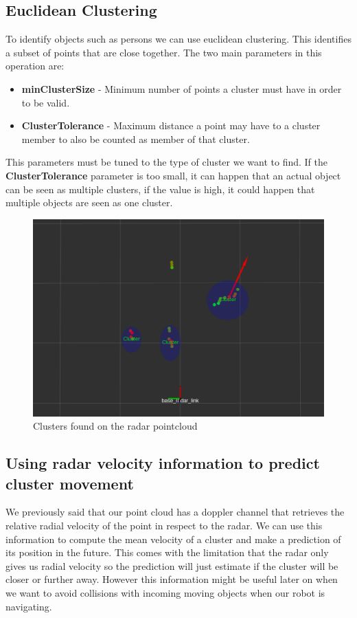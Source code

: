 \documentclass[12pt]{article}
\begin{document}
\subsection{Euclidean Clustering}
To identify objects such as persons we can use euclidean clustering. This identifies a subset of points that are close together. The two main parameters in this operation are:
\begin{itemize}
\item \textbf{minClusterSize} - Minimum number of points a cluster must have in order to be valid.
\item \textbf{ClusterTolerance}  - Maximum distance a point may have to a cluster member to also be counted as member of that cluster.
\end{itemize}
This parameters must be tuned to the type of cluster we want to find. 
If the \textbf{ClusterTolerance} parameter is too small, it can happen that an actual object can be seen as multiple clusters, if the value is high, it could happen that multiple objects are seen as one cluster.
\begin{figure}[!htb]
    \centering
    \includegraphics[width=\linewidth]{cluster.png}
    \caption{Clusters found on the radar pointcloud}
    \label{fig:clustering}
\end{figure}
\subsection{Using radar velocity information to predict cluster movement}
We previously said that our point cloud has a doppler channel that retrieves the relative radial velocity of the point in respect to the radar. We can use this information to compute the mean velocity of a cluster and make a prediction of its position in the future. This comes with the limitation that the radar only gives us radial velocity so the prediction will just estimate if the cluster will be closer or further away. 
However this information might be useful later on when we want to avoid collisions with incoming moving objects when our robot is navigating.
\end{document}
